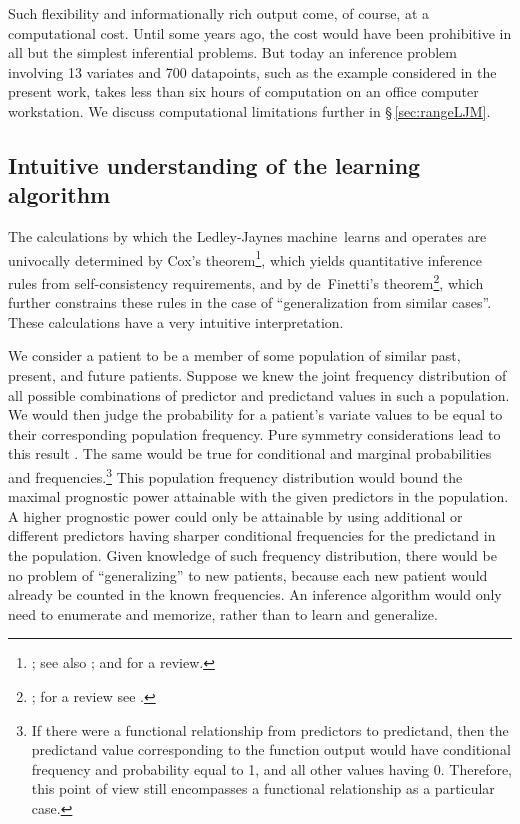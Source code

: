 \documentclass[utf8]{FrontiersinHarvard_mod} %
\newcommand*{\sect}{\S}%
\newcommand*{\sects}{\S\S}%
\renewcommand*{\|}[1][]{\nonscript\:#1\vert\nonscript\:\mathopen{}}
\newcommand*{\ljm}{Ledley-Jaynes machine}
\begin{document}
Such flexibility and informationally rich output come, of course, at a computational cost. Until some years ago, the cost would have been prohibitive in all but the simplest inferential problems. But today an inference problem involving 13 variates and 700 datapoints, such as the example considered in the present work, takes less than six hours of computation on an office computer workstation. We discuss computational limitations further in \sect\,\ref{sec:rangeLJM}.

\subsection{Intuitive understanding of the learning algorithm}
\label{sec:the_machine_learning}

The calculations by which the \ljm\ learns and operates are univocally determined by Cox's theorem\footnote{\citealp{cox1946,cox1961,polya1954,polya1954b_r1968,tribus1969,fine1973,rosenkrantz1977,paris1994_r2006,snow1998,halpern1999b,arnborgetal2001,snow2001,claytonetal2017}; see also \citealp{hailperin1996}; and \citealp{vanhorn2003} for a review.}, which yields quantitative inference rules from self-consistency requirements, and by de~Finetti's theorem\footnote{\citealp[\sects~4.2--4.3]{definetti1930,definetti1937,bernardoetal1994_r2000}; for a review see \citealp{dawid2013}.}, which further constrains these rules in the case of \enquote{generalization from similar cases}. These calculations have a very intuitive interpretation.

We consider a patient to be a member of some population of similar past, present, and future patients. Suppose we knew the joint frequency distribution of all possible combinations of predictor and predictand values in such a population. We would then judge the probability for a patient's variate values to be equal to their corresponding population frequency. Pure symmetry considerations lead to this result \citetext{\citealp[Appendix on eduction]{johnson1924}; \citealp[\sects~4.2--4.3]{johnson1932c,definetti1930,dawid2013,bernardoetal1994_r2000}}. The same would be true for conditional and marginal probabilities and frequencies.\footnote{If there were a functional relationship from predictors to predictand, then the predictand value corresponding to the function output would have conditional frequency and probability equal to 1, and all other values having 0. Therefore, this point of view still encompasses a functional relationship as a particular case.} This population frequency distribution would bound the maximal prognostic power attainable with the given predictors in the population. A higher prognostic power could only be attainable by using additional or different predictors having sharper conditional frequencies for the predictand in the population. Given knowledge of such frequency distribution, there would be no problem of \enquote{generalizing} to new patients, because each new patient would already be counted in the known frequencies. An inference algorithm would only need to enumerate and memorize, rather than to learn and generalize.
\end{document}
